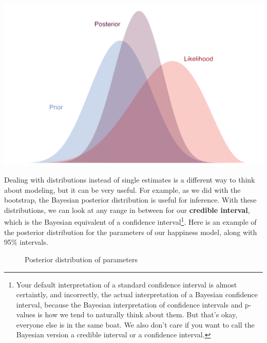 \documentclass[
  letterpaper,
]{krantz}
\begin{document}
\includegraphics{img/prior2post_clean.png}

Dealing with distributions instead of single estimates is a different
way to think about modeling, but it can be very useful. For example, as
we did with the bootstrap, the Bayesian posterior distribution is useful
for inference. With these distributions, we can look at any range in
between for our \textbf{credible interval}, which is the Bayesian
equivalent of a confidence interval\footnote{Your default interpretation
  of a standard confidence interval is almost certaintly, and
  incorrectly, the actual interpretation of a Bayesian confidence
  interval, because the Bayesian interpretation of confidence intervals
  and p-values is how we tend to naturally think about them. But that's
  okay, everyone else is in the same boat. We also don't care if you
  want to call the Bayesian version a credible interval or a confidence
  interval.}. Here is an example of the posterior distribution for the
parameters of our happiness model, along with 95\% intervals.

\begin{figure}[H]


\caption{\label{fig-r-bayesian-posterior}Posterior distribution of
parameters}

\end{figure}%
\end{document}
